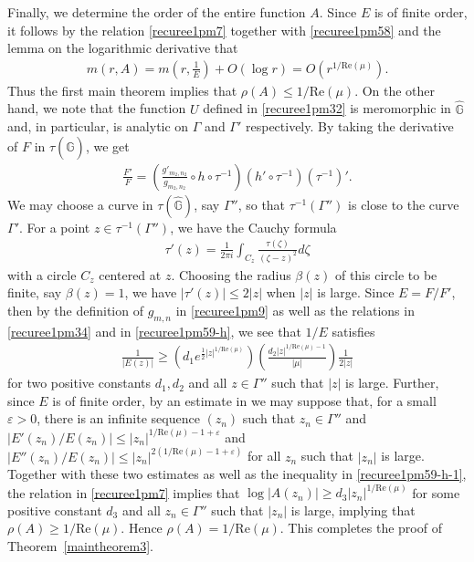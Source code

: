 \documentclass[12pt]{amsart}
\numberwithin{equation}{section}
\begin{document}
Finally, we determine the order of the entire function $A$. Since $E$ is of finite order, it follows by the relation \eqref{recuree1pm7} together with \eqref{recuree1pm58} and the lemma on the logarithmic derivative that
\begin{equation*}
\begin{split}
m(r,A)=m\left(r,\frac{1}{E}\right)+O(\log r)=O(r^{1/\text{Re}(\mu)}).
\end{split}
\end{equation*}
Thus the first main theorem implies that $\rho(A)\leq 1/\text{Re}(\mu)$. On the other hand, we note that the function $U$ defined in \eqref{recuree1pm32} is meromorphic in $\hat{\mathbb{G}}$ and, in particular, is analytic on $\Gamma$ and $\Gamma'$ respectively. By taking the derivative of $F$ in $\tau(\hat{\mathbb{G}})$, we get
\begin{equation}\label{recuree1pm59-h}
\begin{split}
\frac{F'}{F}=\left(\frac{g'_{m_2,n_2}}{g_{m_2,n_2}}\circ h \circ \tau^{-1}\right)(h'\circ \tau^{-1})(\tau^{-1})'.
\end{split}
\end{equation}
We may choose a curve in $\tau(\hat{\mathbb{G}})$, say $\Gamma''$, so that $\tau^{-1}(\Gamma'')$ is close to the curve $\Gamma'$. For a point $z\in\tau^{-1}(\Gamma'')$, we have the Cauchy formula
\begin{equation*}%
\begin{split}
\tau'(z)=\frac{1}{2\pi i}\int_{C_z}\frac{\tau(\zeta)}{(\zeta-z)^2}d\zeta
\end{split}
\end{equation*}
with a circle $C_z$ centered at $z$. Choosing the radius $\beta(z)$ of this circle to be finite, say $\beta(z)=1$, we have $|\tau'(z)|\leq 2|z|$ when $|z|$ is large. Since $E=F/F'$, then by the definition of $g_{m,n}$ in \eqref{recuree1pm9} as well as the relations in \eqref{recuree1pm34} and in \eqref{recuree1pm59-h}, we see that $1/E$ satisfies
\begin{equation}\label{recuree1pm59-h-1}
\begin{split}
\frac{1}{|E(z)|}\geq \left(d_1e^{\frac{1}{2}|z|^{1/\text{Re}(\mu)}}\right)\left(\frac{d_2|z|^{1/\text{Re}(\mu)-1}}{|\mu|}\right)\frac{1}{2|z|}
\end{split}
\end{equation}
for two positive constants $d_1,d_2$ and all $z\in\Gamma''$ such that $|z|$ is large.
Further, since $E$ is of finite order, by an estimate in \cite[Corollary~2]{gundersen:88} we may suppose that, for a small $\varepsilon>0$, there is an infinite sequence $(z_n)$ such that $z_n\in\Gamma''$ and $|E'(z_n)/E(z_n)|\leq |z_n|^{1/\text{Re}(\mu)-1+\varepsilon}$ and $|E''(z_n)/E(z_n)|\leq |z_n|^{2(1/\text{Re}(\mu)-1+\varepsilon)}$ for all $z_n$ such that $|z_n|$ is large. Together with these two estimates as well as the inequality in \eqref{recuree1pm59-h-1}, the relation in \eqref{recuree1pm7} implies that $\log |A(z_n)|\geq d_3|z_n|^{1/\text{Re}(\mu)}$ for some positive constant $d_3$ and all $z_n\in\Gamma''$ such that $|z_n|$ is large, implying that $\rho(A)\geq 1/\text{Re}(\mu)$. Hence $\rho(A)=1/\text{Re}(\mu)$. This completes the proof of Theorem~\ref{maintheorem3}.
\end{document}
